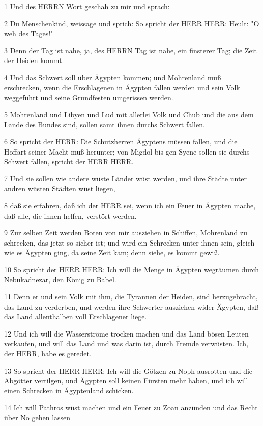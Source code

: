 \par 1 Und des HERRN Wort geschah zu mir und sprach:
\par 2 Du Menschenkind, weissage und sprich: So spricht der HERR HERR: Heult: "O weh des Tages!"
\par 3 Denn der Tag ist nahe, ja, des HERRN Tag ist nahe, ein finsterer Tag; die Zeit der Heiden kommt.
\par 4 Und das Schwert soll über Ägypten kommen; und Mohrenland muß erschrecken, wenn die Erschlagenen in Ägypten fallen werden und sein Volk weggeführt und seine Grundfesten umgerissen werden.
\par 5 Mohrenland und Libyen und Lud mit allerlei Volk und Chub und die aus dem Lande des Bundes sind, sollen samt ihnen durchs Schwert fallen.
\par 6 So spricht der HERR: Die Schutzherren Ägyptens müssen fallen, und die Hoffart seiner Macht muß herunter; von Migdol bis gen Syene sollen sie durchs Schwert fallen, spricht der HERR HERR.
\par 7 Und sie sollen wie andere wüste Länder wüst werden, und ihre Städte unter andren wüsten Städten wüst liegen,
\par 8 daß sie erfahren, daß ich der HERR sei, wenn ich ein Feuer in Ägypten mache, daß alle, die ihnen helfen, verstört werden.
\par 9 Zur selben Zeit werden Boten von mir ausziehen in Schiffen, Mohrenland zu schrecken, das jetzt so sicher ist; und wird ein Schrecken unter ihnen sein, gleich wie es Ägypten ging, da seine Zeit kam; denn siehe, es kommt gewiß.
\par 10 So spricht der HERR HERR: Ich will die Menge in Ägypten wegräumen durch Nebukadnezar, den König zu Babel.
\par 11 Denn er und sein Volk mit ihm, die Tyrannen der Heiden, sind herzugebracht, das Land zu verderben, und werden ihre Schwerter ausziehen wider Ägypten, daß das Land allenthalben voll Erschlagener liege.
\par 12 Und ich will die Wasserströme trocken machen und das Land bösen Leuten verkaufen, und will das Land und was darin ist, durch Fremde verwüsten. Ich, der HERR, habe es geredet.
\par 13 So spricht der HERR HERR: Ich will die Götzen zu Noph ausrotten und die Abgötter vertilgen, und Ägypten soll keinen Fürsten mehr haben, und ich will einen Schrecken in Ägyptenland schicken.
\par 14 Ich will Pathros wüst machen und ein Feuer zu Zoan anzünden und das Recht über No gehen lassen
